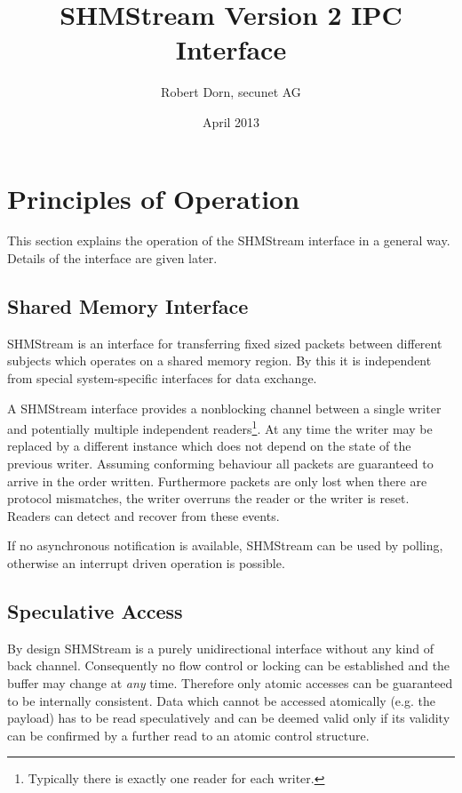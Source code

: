 \documentclass[a4paper,twoside,titlepage]{article}
\title{SHMStream Version 2 IPC Interface}
\date{April 2013}
\author{Robert Dorn, secunet AG}
\begin{document}
\maketitle

\clearpage

\tableofcontents
\listoffigures

\section{Principles of Operation}
This section explains the operation of the SHMStream interface in a general
way. Details of the interface are given later.

\subsection{Shared Memory Interface}
SHMStream is an interface for transferring fixed sized packets between different
subjects which operates on a shared memory region. By this it is independent
from special system-specific interfaces for data exchange.

A SHMStream interface provides a nonblocking channel between a single writer
and potentially multiple independent readers\footnote{Typically there is
exactly one reader for each writer.}. At any time the writer may be replaced by
a different instance which does not depend on the state of the previous writer.
Assuming conforming behaviour all packets are guaranteed to arrive in the order
written. Furthermore packets are only lost when there are protocol mismatches,
the writer overruns the reader or the writer is reset.
Readers can detect and recover from these events.

If no asynchronous notification is available, SHMStream can be used by polling,
otherwise an interrupt driven operation is possible.

\subsection{Speculative Access}
By design SHMStream is a purely unidirectional interface without any kind of
back channel.  Consequently no flow control or locking can be established and
the buffer may change at \emph{any} time. Therefore only atomic accesses can be
guaranteed to be internally consistent.  Data which cannot be accessed
atomically (e.g.  the payload) has to be read speculatively and can be deemed
valid only if its validity can be confirmed by a further read to an atomic
control structure.
\end{document}
